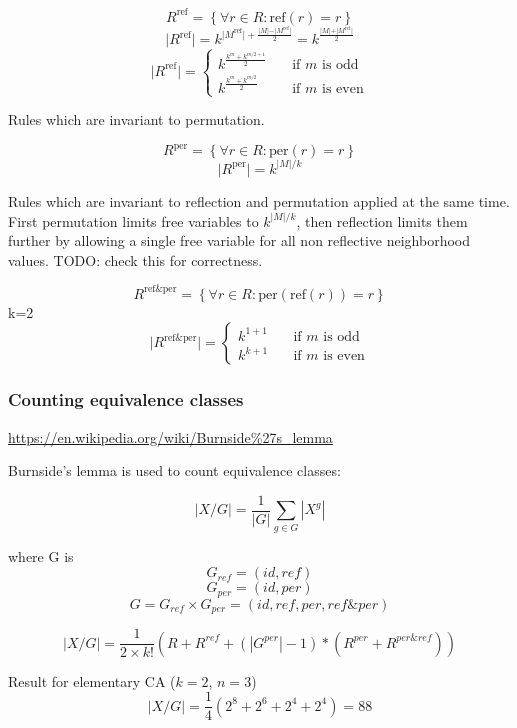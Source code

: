 \documentclass{ijuc}
\begin{document}
\[ R^\mathrm{ref} = \left\{ \forall r \in R : \mathrm{ref}(r) = r \right\} \]
\[ \vert R^\mathrm{ref} \vert = k^{ \vert M^\mathrm{ref} \vert + \frac{\vert M \vert - \vert M^\mathrm{ref} \vert}{2} } = k^{ \frac{\vert M \vert + \vert M^\mathrm{ref} \vert}{2} } \]
\[ \vert R^\mathrm{ref} \vert = \left\{ 
  \begin{array}{ll}
    k^{\frac{k^m + k^{m/2+1}}{2}} & \quad \textrm{if $m$ is odd }\\
    k^{\frac{k^m + k^{m/2  }}{2}} & \quad \textrm{if $m$ is even}
  \end{array} \right.
\]

Rules which are invariant to permutation.

\[ R^\mathrm{per} = \left\{ \forall r \in R : \mathrm{per}(r) = r \right\} \]
\[ \vert R^\mathrm{per} \vert = k^{\vert M \vert / k} \]

Rules which are invariant to reflection and permutation applied at the same time.
First permutation limits free variables to \(k^{\vert M \vert / k}\), then reflection
limits them further by allowing a single free variable for all non reflective neighborhood values.
TODO: check this for correctness.

\[ R^\mathrm{ref \& per} = \left\{ \forall r \in R : \mathrm{per}(\mathrm{ref}(r)) = r \right\} \]
k=2
\[ \vert R^\mathrm{ref \& per} \vert = \left\{ 
  \begin{array}{ll}
    k^{1 + 1} & \quad \textrm{if $m$ is odd }\\
    k^{k + 1} & \quad \textrm{if $m$ is even}
  \end{array} \right.
\]
\subsubsection{Counting equivalence classes}

\url{https://en.wikipedia.org/wiki/Burnside%27s_lemma}

Burnside's lemma is used to count equivalence classes:

\[ |X/G| = \frac{1}{|G|}\sum_{g \in G}|X^g| \]

where G is 
\[ G_{ref} = (id, ref) \]
\[ G_{per} = (id, per) \]
\[ G = G_{ref} \times G_{per} = (id, ref, per, ref \& per) \]

\[ |X/G| = \frac{1}{2 \times k!} ( R + R^{ref} + (|G^{per}|-1)*(R^{per} + R^{per \& ref}) ) \]

Result for elementary CA (\(k=2\), \(n=3\))
\[ |X/G| = \frac{1}{4} (2^8 + 2^6 + 2^4 + 2^4) = 88 \]
\end{document}
